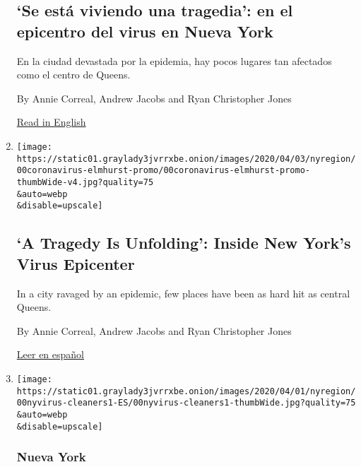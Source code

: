 \begin{enumerate}
{  \subsection{`Se está viviendo una tragedia': en el epicentro del virus
  en Nueva
  York}\label{se-estuxe1-viviendo-una-tragedia-en-el-epicentro-del-virus-en-nueva-york}}

  En la ciudad devastada por la epidemia, hay pocos lugares tan
  afectados como el centro de Queens.

  By Annie Correal, Andrew Jacobs and Ryan Christopher Jones

  \href{https://www.nytimes3xbfgragh.onion/2020/04/09/nyregion/coronavirus-queens-corona-jackson-heights-elmhurst.html}{Read
  in English}
\item
  \href{/2020/04/09/nyregion/coronavirus-queens-corona-jackson-heights-elmhurst.html}{}

  \texttt{[image: https://static01.graylady3jvrrxbe.onion/images/2020/04/03/nyregion/00coronavirus-elmhurst-promo/00coronavirus-elmhurst-promo-thumbWide-v4.jpg?quality=75\\\&auto=webp\\\&disable=upscale]}

  \hypertarget{a-tragedy-is-unfolding-inside-new-yorks-virus-epicenter}{%
  \subsection{`A Tragedy Is Unfolding': Inside New York's Virus
  Epicenter}\label{a-tragedy-is-unfolding-inside-new-yorks-virus-epicenter}}

  In a city ravaged by an epidemic, few places have been as hard hit as
  central Queens.

  By Annie Correal, Andrew Jacobs and Ryan Christopher Jones

  \href{https://www.nytimes3xbfgragh.onion/es/2020/04/10/espanol/mundo/coronavirus-queens-hospital-elmhurst-corona-jackson-heights.html}{Leer
  en español}
\item
  \href{/es/2020/04/08/espanol/mundo/trabajadoras-domesticas-virus-inmigrantes.html}{}

  \texttt{[image: https://static01.graylady3jvrrxbe.onion/images/2020/04/01/nyregion/00nyvirus-cleaners1-ES/00nyvirus-cleaners1-thumbWide.jpg?quality=75\\\&auto=webp\\\&disable=upscale]}

  \hypertarget{nueva-york}{%
  \subsubsection{Nueva York}\label{nueva-york}}


\end{enumerate}
